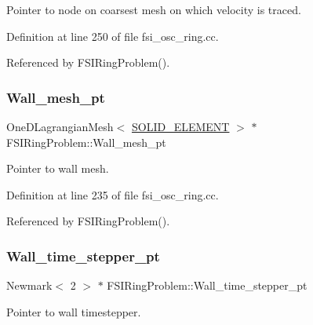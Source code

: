 Pointer to node on coarsest mesh on which velocity is traced. 



Definition at line 250 of file fsi\+\_\+osc\+\_\+ring.\+cc.



Referenced by F\+S\+I\+Ring\+Problem().

\mbox{\label{classFSIRingProblem_a112c5285b6ea49d0e003fc3bdd817332}} 
\subsubsection{\texorpdfstring{Wall\+\_\+mesh\+\_\+pt}{Wall\_mesh\_pt}}
{\footnotesize\ttfamily One\+D\+Lagrangian\+Mesh$<$ \hyperlink{classFSIRingProblem_a96528378f3baf6100aeb6b4fe83bc870}{S\+O\+L\+I\+D\+\_\+\+E\+L\+E\+M\+E\+NT} $>$ $\ast$ F\+S\+I\+Ring\+Problem\+::\+Wall\+\_\+mesh\+\_\+pt\hspace{0.3cm}{\ttfamily [private]}}



Pointer to wall mesh. 



Definition at line 235 of file fsi\+\_\+osc\+\_\+ring.\+cc.



Referenced by F\+S\+I\+Ring\+Problem().

\mbox{\label{classFSIRingProblem_a67d7e17b8b0513e793f94fa4357b5784}} 
\subsubsection{\texorpdfstring{Wall\+\_\+time\+\_\+stepper\+\_\+pt}{Wall\_time\_stepper\_pt}}
{\footnotesize\ttfamily Newmark$<$ 2 $>$ $\ast$ F\+S\+I\+Ring\+Problem\+::\+Wall\+\_\+time\+\_\+stepper\+\_\+pt\hspace{0.3cm}{\ttfamily [private]}}



Pointer to wall timestepper. 



